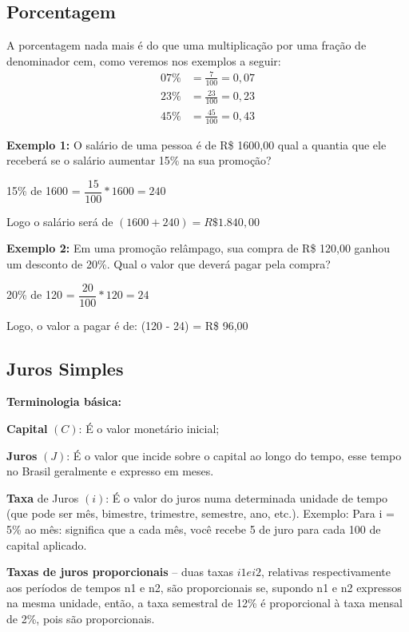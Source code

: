 \begin{multicols*}{2}

	\subsection*{Porcentagem}

	A porcentagem nada mais é do que uma multiplicação por uma fração de denominador cem, como veremos nos exemplos a seguir:
	\begin{align*}
		07\% & = \frac{7}{100} = 0,07  \\[2ex]
		23\% & = \frac{23}{100} = 0,23 \\[2ex]
		45\% & = \frac{45}{100} = 0,43
	\end{align*}

	\textbf{Exemplo 1:} O salário de uma pessoa é de R\$ 1600,00 qual a quantia que ele receberá se o salário aumentar 15\% na sua promoção?

	15\% de 1600  =  {$\dfrac{15}{100}*1600 = 240$}

	Logo o salário será de $(1600 + 240) = {R\$1.840,00}$

	\textbf{Exemplo 2:} Em uma promoção relâmpago, sua compra de R\$ 120,00 ganhou um desconto de 20\%. Qual o valor que deverá pagar pela compra?

	20\% de 120  =  {$\dfrac{20}{100} * 120 = 24$}

	Logo, o valor a pagar é de: {(120 - 24) = R\$ 96,00}

	\subsection*{Juros Simples}

	\textbf{Terminologia básica:}

	\textbf{Capital} $(C)$: É o valor monetário inicial;

	\textbf{Juros} $(J)$: É o valor que incide sobre o capital ao longo do tempo, esse tempo no Brasil geralmente e expresso em meses.

	\textbf{Taxa} de Juros $(i)$: É o valor do juros numa determinada unidade de tempo (que pode ser mês, bimestre, trimestre, semestre, ano, etc.). Exemplo: Para i = 5\% ao mês: significa que a cada mês, você recebe 5 de juro para cada 100 de capital aplicado.

	\textbf{Taxas de juros proporcionais}  --  duas taxas  $ i1e i2$, relativas respectivamente aos períodos de tempos n1 e n2, são proporcionais se, supondo n1 e n2 expressos na mesma unidade, então, a taxa semestral de 12\% é proporcional à taxa mensal de 2\%, pois são proporcionais.


\end{multicols*}
